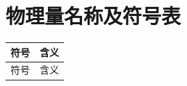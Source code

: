 \chapter*{物理量名称及符号表}

\begin{longtable}{>{\raggedright\arraybackslash}p{} >{\raggedright\arraybackslash}p{}}
\toprule
符号 & 含义 \\
\midrule
\endfirsthead
\toprule
符号 & 含义 \\
\midrule
\endhead
\bottomrule
\end{longtable}
